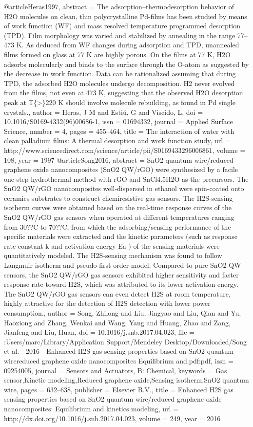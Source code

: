 @article{Heras1997,
abstract = {The adsorption–thermodesorption behavior of H2O molecules on clean, thin polycrystalline Pd-films has been studied by means of work function (WF) and mass resolved temperature programmed desorption (TPD). Film morphology was varied and stabilized by annealing in the range 77–473 K. As deduced from WF changes during adsorption and TPD, unannealed films formed on glass at 77 K are highly porous. On the films at 77 K, H2O adsorbs molecularly and binds to the surface through the O-atom as suggested by the decrease in work function. Data can be rationalized assuming that during TPD, the adsorbed H2O molecules undergo decomposition. H2 never evolved from the films, not even at 473 K, suggesting that the observed H2O desorption peak at T{\{}{\textgreater}{\}}220 K should involve molecule rebuilding, as found in Pd single crystals.},
author = {Heras, J M and Esti{\'{u}}, G and Viscido, L},
doi = {10.1016/S0169-4332(96)00686-1},
issn = {01694332},
journal = {Applied Surface Science},
number = {4},
pages = {455--464},
title = {{The interaction of water with clean palladium films: A thermal desorption and work function study}},
url = {http://www.sciencedirect.com/science/article/pii/S0169433296006861},
volume = {108},
year = {1997}
}
@article{Song2016,
abstract = {SnO2 quantum wire/reduced graphene oxide nanocomposites (SnO2 QW/rGO) were synthesized by a facile one-step hydrothermal method with rGO and SnCl4.5H2O as the precursors. The SnO2 QW/rGO nanocomposites well-dispersed in ethanol were spin-coated onto ceramics substrates to construct chemiresistive gas sensors. The H2S-sensing isotherm curves were obtained based on the real-time response curves of the SnO2 QW/rGO gas sensors when operated at different temperatures ranging from 30??C to 70??C, from which the adsorbing/sensing performance of the specific materials were extracted and the kinetic parameters (such as response rate constant k and activation energy Ea ) of the sensing-materials were quantitatively modeled. The H2S-sensing mechanism was found to follow Langmuir isotherm and pseudo-first-order model. Compared to pure SnO2 QW sensors, the SnO2 QW/rGO gas sensors exhibited higher sensitivity and faster response rate toward H2S, which was attributed to its lower activation energy. The SnO2 QW/rGO gas sensors can even detect H2S at room temperature, highly attractive for the detection of H2S detection with lower power consumption.},
author = {Song, Zhilong and Liu, Jingyao and Liu, Qian and Yu, Haoxiong and Zhang, Wenkai and Wang, Yang and Huang, Zhao and Zang, Jianfeng and Liu, Huan},
doi = {10.1016/j.snb.2017.04.023},
file = {:Users/marc/Library/Application Support/Mendeley Desktop/Downloaded/Song et al. - 2016 - Enhanced H2S gas sensing properties based on SnO2 quantum wirereduced graphene oxide nanocomposites Equilibrium and.pdf:pdf},
issn = {09254005},
journal = {Sensors and Actuators, B: Chemical},
keywords = {Gas sensor,Kinetic modeling,Reduced graphene oxide,Sensing isotherm,SnO2 quantum wire},
pages = {632--638},
publisher = {Elsevier B.V.},
title = {{Enhanced H2S gas sensing properties based on SnO2 quantum wire/reduced graphene oxide nanocomposites: Equilibrium and kinetics modeling}},
url = {http://dx.doi.org/10.1016/j.snb.2017.04.023},
volume = {249},
year = {2016}
}
